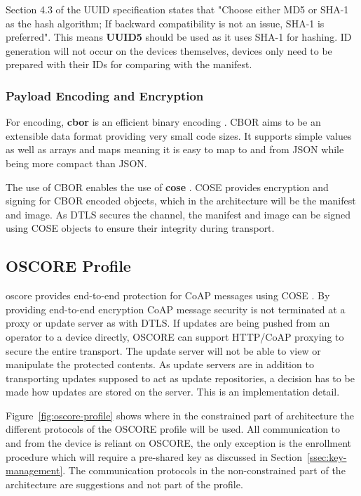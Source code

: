 \documentclass[0-thesis.tex]{subfiles}
\begin{document}
Section 4.3 of the UUID specification states that "Choose either MD5 or SHA-1 as the hash
algorithm; If backward compatibility is not an issue, SHA-1 is preferred". This means
\textbf{UUID5} should be used as it uses SHA-1 for hashing. ID generation will not occur
on the devices themselves, devices only need to be prepared with their IDs for comparing
with the manifest.

\subsubsection{Payload Encoding and Encryption}
\label{sssec:encoding-encryption}
For encoding, \textbf{\gls{cbor}} is an efficient binary encoding \parencite{rfc7049}.
CBOR aims to be an extensible data format providing very small code sizes. It supports
simple values as well as arrays and maps meaning it is easy to map to and from JSON while
being more compact than JSON. 

The use of CBOR enables the use of \textbf{\gls{cose}} \parencite{rfc8152}. COSE provides
encryption and signing for CBOR encoded objects, which in the architecture will be the
manifest and image. As DTLS secures the channel, the manifest and image can be signed
using COSE objects to ensure their integrity during transport. 

\subsection{OSCORE Profile}
\label{ssec:oscore-profile}
\acrfull{oscore} provides end-to-end protection for CoAP messages using COSE
\parencite{oscore}. By providing end-to-end encryption CoAP message security is not
terminated at a proxy or update server as with DTLS. If updates are being pushed from an
operator to a device directly, OSCORE can support HTTP/CoAP proxying to secure the entire
transport. The update server will not be able to view or manipulate the protected
contents. As update servers are in addition to transporting updates supposed to act as
update repositories, a decision has to be made how updates are stored on the server. This
is an implementation detail.

Figure~\ref{fig:oscore-profile} shows where in the constrained part of architecture the
different protocols of the OSCORE profile will be used. All communication to and from the
device is reliant on OSCORE, the only exception is the enrollment procedure which will
require a pre-shared key as discussed in Section~\ref{ssec:key-management}. The
communication protocols in the non-constrained part of the architecture are suggestions
and not part of the profile. 
\end{document}
